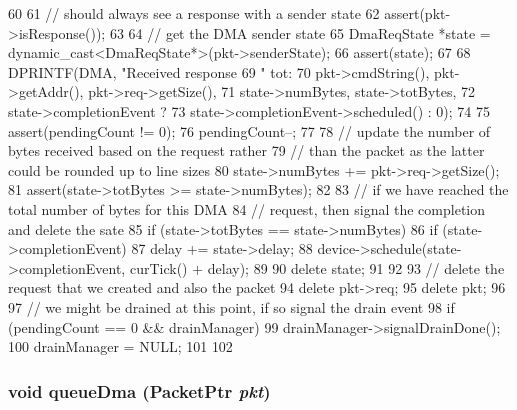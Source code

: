 \begin{DoxyCode}
60 {
61     // should always see a response with a sender state
62     assert(pkt->isResponse());
63 
64     // get the DMA sender state
65     DmaReqState *state = dynamic_cast<DmaReqState*>(pkt->senderState);
66     assert(state);
67 
68     DPRINTF(DMA, "Received response %
69             " tot: %
70             pkt->cmdString(), pkt->getAddr(), pkt->req->getSize(),
71             state->numBytes, state->totBytes,
72             state->completionEvent ?
73             state->completionEvent->scheduled() : 0);
74 
75     assert(pendingCount != 0);
76     pendingCount--;
77 
78     // update the number of bytes received based on the request rather
79     // than the packet as the latter could be rounded up to line sizes
80     state->numBytes += pkt->req->getSize();
81     assert(state->totBytes >= state->numBytes);
82 
83     // if we have reached the total number of bytes for this DMA
84     // request, then signal the completion and delete the sate
85     if (state->totBytes == state->numBytes) {
86         if (state->completionEvent) {
87             delay += state->delay;
88             device->schedule(state->completionEvent, curTick() + delay);
89         }
90         delete state;
91     }
92 
93     // delete the request that we created and also the packet
94     delete pkt->req;
95     delete pkt;
96 
97     // we might be drained at this point, if so signal the drain event
98     if (pendingCount == 0 && drainManager) {
99         drainManager->signalDrainDone();
100         drainManager = NULL;
101     }
102 }
\end{DoxyCode}
\hypertarget{classDmaPort_a39ecf6d3539b9a83c7df974058a5846d}{
\subsubsection[{queueDma}]{\setlength{\rightskip}{0pt plus 5cm}void queueDma ({\bf PacketPtr} {\em pkt})}}
\label{classDmaPort_a39ecf6d3539b9a83c7df974058a5846d}



